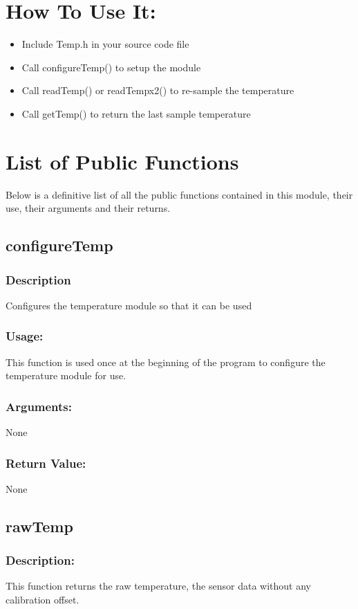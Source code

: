 \documentclass[]{report}
\begin{document}
\section{How To Use It:}
\begin{itemize}
	\item Include Temp.h in your source code file
	\item Call configureTemp() to setup the module
	\item Call readTemp() or readTempx2() to re-sample the temperature
	\item Call getTemp() to return the last sample temperature
\end{itemize}

\section{List of Public Functions}
Below is a definitive list of all the public functions contained in this module, their use, their arguments and their returns.

\subsection{configureTemp}
\subsubsection{Description}
Configures the temperature module so that it can be used

\subsubsection{Usage:}
This function is used once at the beginning of the program to configure the temperature module for use.

\subsubsection{Arguments:}
None

\subsubsection{Return Value:}
None

\subsection{rawTemp}
\subsubsection{Description:}
This function returns the raw temperature, the sensor data without any calibration offset.
\end{document}
